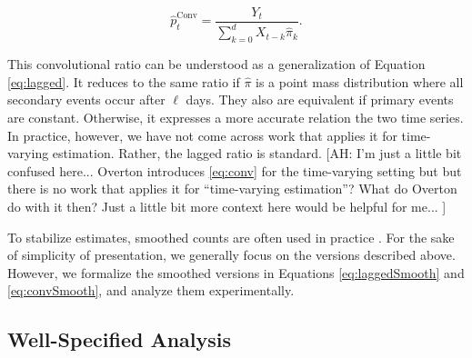 \documentclass{article}
\newcommand{\ahcomment}[1]{{\color{teal}[AH: #1]}}
\begin{document}
\begin{equation}\label{eq:conv}
    \hat{p}_t^{\text{Conv}} = \frac{Y_t}{\sum_{k=0}^d X_{t-k}\hat\pi_k}.%
\end{equation}

\noindent This convolutional ratio can be understood as a generalization of Equation \ref{eq:lagged}. It reduces to the same ratio if $\hat{\pi}$ is a point mass distribution where all secondary events occur after $\ell$ days. They also are equivalent if primary events are constant. Otherwise, it expresses a more accurate relation the two time series. In practice, however, we have not come across work that applies it for time-varying estimation. Rather, the lagged ratio is standard.
\ahcomment{
  I'm just a little bit confused here... Overton introduces \eqref{eq:conv} for
  the time-varying setting but but there is no work that applies it for
  ``time-varying estimation''?  What do Overton do with it then?  Just a little
  bit more context here would be helpful for me...
}


To stabilize estimates, smoothed counts are often used in practice \cite{germany,timevar_ifr,LIU2023100350}. For the sake of simplicity of presentation, we generally focus on the versions described above. However, we formalize the smoothed versions in Equations \ref{eq:laggedSmooth} and \ref{eq:convSmooth}, and analyze them experimentally.


\subsection{Well-Specified Analysis}\label{sec:analysis}
\end{document}
